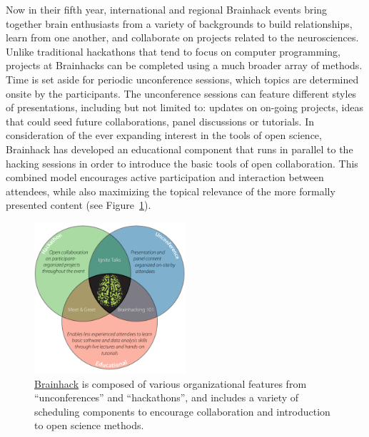 \documentclass[11pt]{bmc_article_s50}
\begin{document}
Now in their fifth year, international and regional Brainhack events bring together brain enthusiasts from a variety of backgrounds to build relationships, learn from one another, and collaborate on projects related to the neurosciences. Unlike traditional hackathons that tend to focus on computer programming, projects at Brainhacks can be completed using a much broader array of methods. Time is set aside for periodic unconference sessions, which topics are determined onsite by the participants. The unconference sessions can feature different styles of presentations, including but not limited to: updates on on-going projects, ideas that could seed future collaborations, panel discussions or tutorials. In consideration of the ever expanding interest in the tools of open science, Brainhack has developed an educational component that runs in parallel to the hacking sessions in order to introduce the basic tools of open collaboration. This combined model encourages active participation and interaction between attendees, while also maximizing the topical relevance of the more formally presented content (see Figure~\ref{fig1}).

\begin{figure}[htp]
\begin{center}
  \includegraphics[width=0.5\textwidth]{Figure_01}
  \caption{\href{http://www.brainhack.org}{Brainhack} is composed of various organizational features from ``unconferences'' and ``hackathons'', and includes a variety of scheduling components to encourage collaboration and introduction to open science methods.}
  \label{fig1}
\end{center}
\end{figure}
\end{document}
